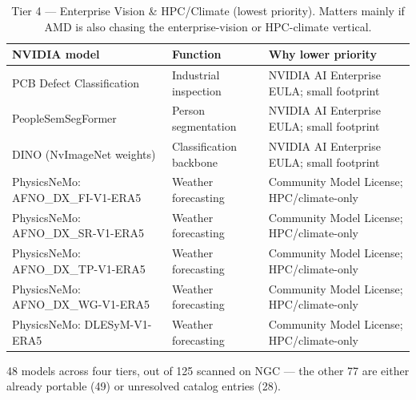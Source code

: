 \documentclass[10pt,onecolumn]{IEEEtran}
\begin{document}
\begin{table}[H]
\centering
\caption{Tier 4 --- Enterprise Vision \& HPC/Climate (lowest priority). Matters mainly if AMD is also chasing the enterprise-vision or HPC-climate vertical.}
\label{tab:a4}
\footnotesize
\begin{tabular}{@{}p{1.6in}p{2.1in}p{2.3in}@{}}
\toprule
NVIDIA model & Function & Why lower priority \\
\midrule
PCB Defect Classification & Industrial inspection & NVIDIA AI Enterprise EULA; small footprint \\
PeopleSemSegFormer & Person segmentation & NVIDIA AI Enterprise EULA; small footprint \\
DINO (NvImageNet weights) & Classification backbone & NVIDIA AI Enterprise EULA; small footprint \\
PhysicsNeMo: AFNO\_DX\_FI-V1-ERA5 & Weather forecasting & Community Model License; HPC/climate-only \\
PhysicsNeMo: AFNO\_DX\_SR-V1-ERA5 & Weather forecasting & Community Model License; HPC/climate-only \\
PhysicsNeMo: AFNO\_DX\_TP-V1-ERA5 & Weather forecasting & Community Model License; HPC/climate-only \\
PhysicsNeMo: AFNO\_DX\_WG-V1-ERA5 & Weather forecasting & Community Model License; HPC/climate-only \\
PhysicsNeMo: DLESyM-V1-ERA5 & Weather forecasting & Community Model License; HPC/climate-only \\
\bottomrule
\end{tabular}
\end{table}

48 models across four tiers, out of 125 scanned on NGC --- the other 77 are either already portable (49) or unresolved catalog entries (28).
\end{document}
